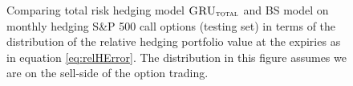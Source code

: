 \documentclass[letterpaper,12pt,titlepage,oneside,final]{book}
\numberwithin{equation}{section}
\theoremstyle{definition}
\newcommand{\modelT}{\textsc{GRU}_{\textsc{total}}}
\begin{document}
\begin{figure}[htp!]
	\centering
	\caption{Comparing total risk hedging model $\modelT$ and BS model  on monthly hedging S\&P 500 call options (testing set) in terms of the distribution of the  relative hedging portfolio value at the expiries as in equation \eqref{eq:relHError}. The distribution in this figure assumes we are on the sell-side of the option trading.} 
	\label{fig:CallTotalM2}
	\centering

\end{figure}
\end{document}

